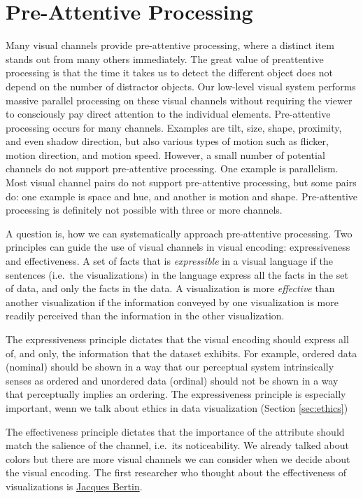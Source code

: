 \documentclass[
]{book}
\begin{document}
\hypertarget{pre-attentive-processing}{%
\section{Pre-Attentive Processing}\label{pre-attentive-processing}}

Many visual channels provide pre-attentive processing, where a distinct item stands out from many others immediately. The great value of preattentive processing is that the time it takes us to detect the different object does not depend on the number of distractor objects. Our low-level visual system performs massive parallel processing on these visual channels without requiring the viewer to consciously pay direct attention to the individual elements. Pre-attentive processing occurs for many channels. Examples are tilt, size, shape, proximity, and even shadow direction, but also various types of motion such as flicker, motion direction, and motion speed. However, a small number of potential channels do not support pre-attentive processing. One example is parallelism. Most visual channel pairs do not support pre-attentive processing, but some pairs do: one example is space and hue, and another is motion and shape. Pre-attentive processing is definitely not possible with three or more channels.

A question is, how we can systematically approach pre-attentive processing. Two principles can guide the use of visual channels in visual encoding: expressiveness and effectiveness. A set of facts that is \emph{expressible} in a visual language if the sentences (i.e.~the visualizations) in the language express all the facts in the set of data, and only the facts in the data. A visualization is more \emph{effective} than another visualization if the information conveyed by one visualization is more readily perceived than the information in the other visualization.

The expressiveness principle dictates that the visual encoding should express all of, and only, the information that the dataset exhibits. For example, ordered data (nominal) should be shown in a way that our perceptual system intrinsically senses as ordered and unordered data (ordinal) should not be shown in a way that perceptually implies an ordering. The expressiveness principle is especially important, wenn we talk about ethics in data visualization (Section \ref{sec:ethics})

The effectiveness principle dictates that the importance of the attribute should match the salience of the channel, i.e.~its noticeability. We already talked about colors but there are more visual channels we can consider when we decide about the visual encoding. The first researcher who thought about the effectiveness of visualizations is \href{https://en.wikipedia.org/wiki/Jacques_Bertin}{Jacques Bertin}.
\end{document}
